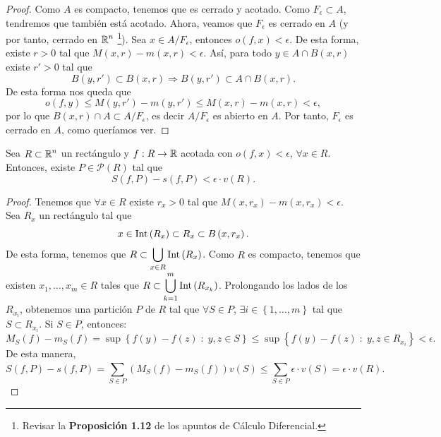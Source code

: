 \begin{proof}
Como $\displaystyle A $ es compacto, tenemos que es cerrado y acotado. Como $\displaystyle F_{\epsilon }\subset A $, tendremos que también está acotado. Ahora, veamos que $\displaystyle F_{\epsilon } $ es cerrado en $\displaystyle A $ (y por tanto, cerrado en $\displaystyle \mathbb{R}^{n} $ \footnote{Revisar la \textbf{Proposición 1.12} de los apuntos de Cálculo Diferencial.}). Sea $\displaystyle x \in A/F_{\epsilon } $, entonces $\displaystyle o\left(f,x \right) < \epsilon  $. De esta forma, existe $\displaystyle r > 0 $ tal que $\displaystyle M\left(x,r\right)-m\left(x,r\right) < \epsilon  $. Así, para todo $\displaystyle y \in A \cap B\left(x,r\right) $ existe $\displaystyle r' > 0 $ tal que 
\[B\left(y,r'\right)\subset B\left(x,r\right) \Rightarrow B\left(y,r'\right) \subset A \cap B\left(x,r\right) .\]
De esta forma nos queda que
\[o\left(f,y\right)\leq M\left(y,r'\right)-m\left(y,r'\right) \leq M\left(x,r\right)-m\left(x,r\right)<\epsilon ,\]
por lo que $\displaystyle B\left(x,r\right)\cap A \subset A/F_{\epsilon } $, es decir $\displaystyle A/F_{\epsilon } $ es abierto en $\displaystyle A $. Por tanto, $\displaystyle F_{\epsilon } $ es cerrado en $\displaystyle A $, como queríamos ver. 
\end{proof}
\begin{lema}
Sea $\displaystyle R \subset \mathbb{R}^{n} $ un rectángulo y $\displaystyle f : R \to \mathbb{R} $ acotada con $\displaystyle o\left(f,x\right) < \epsilon  $, $\displaystyle \forall x \in R $. Entonces, existe $\displaystyle P \in \mathcal{P}\left(R\right) $ tal que
\[S\left(f,P\right)-s\left(f,P\right) < \epsilon \cdot v\left(R\right) .\]
\end{lema}
\begin{proof}
Tenemos que $\displaystyle \forall x \in R $ existe $\displaystyle r_{x} > 0 $ tal que $\displaystyle M\left(x,r_{x}\right)-m\left(x,r_{x}\right)<\epsilon  $. Sea $\displaystyle R_{x} $ un rectángulo tal que 
\[x \in \operatorname{Int}\left(R_{x}\right)\subset R_{x} \subset B\left(x, r_{x}\right) .\]
De esta forma, tenemos que $\displaystyle R \subset \bigcup_{x \in R}\operatorname{Int}\left(R_{x}\right) $. Como $\displaystyle R $ es compacto, tenemos que existen $\displaystyle x_{1}, \ldots, x_{m} \in R $ tales que $\displaystyle R \subset \bigcup_{k = 1}^{m}\operatorname{Int}\left(R_{x_{k}}\right) $. Prolongando los lados de los $\displaystyle R_{x_{i}} $, obtenemos una partición $\displaystyle P $ de $\displaystyle R $ tal que $\displaystyle \forall S \in P $, $\displaystyle \exists i \in \left\{ 1, \ldots, m\right\}  $ tal que $\displaystyle S \subset R_{x_{i}} $. Si $\displaystyle S \in P $, entonces:
\[M_{S}\left(f\right)-m_{S}\left(f\right) = \sup \left\{ f\left(y\right)-f\left(z\right) \; : \; y,z \in S\right\} \leq \sup \left\{ f\left(y\right)-f\left(z\right) \; : \; y,z \in R_{x_{i}}\right\} <\epsilon  .\]
De esta manera, 
\[S\left(f,P\right)-s\left(f,P\right)=\sum^{}_{S\in P}\left(M_{S}\left(f\right)-m_{S}\left(f\right)\right)v\left(S\right) \leq \sum^{}_{S \in P}\epsilon \cdot v\left(S\right) = \epsilon \cdot v\left(R\right).\]
\end{proof}
